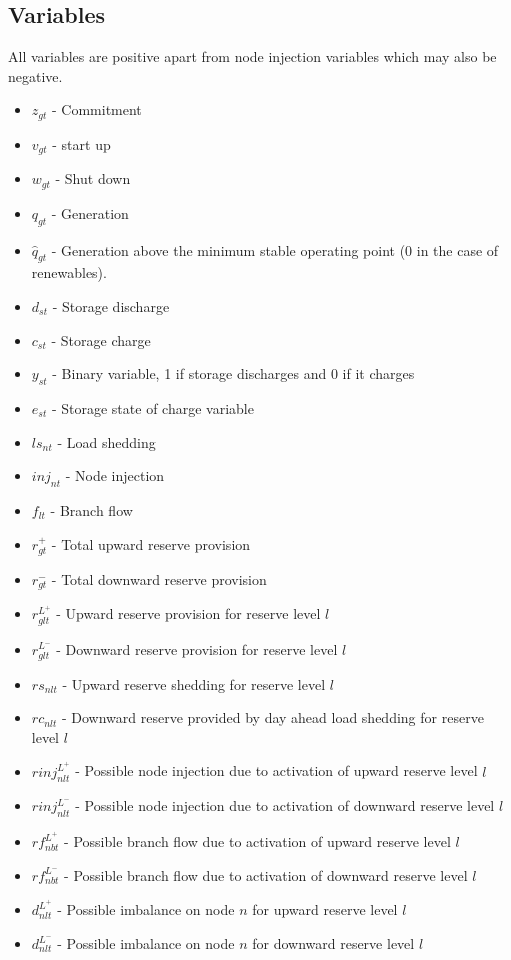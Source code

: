 \documentclass[number,times]{elsarticle}
\begin{document}
\subsection{Variables}

All variables are positive apart from node injection variables which may also be negative.

\begin{itemize}
    \item $z_{gt}$ - Commitment
    \item $v_{gt}$ - start up
    \item $w_{gt}$ - Shut down
    \item $q_{gt}$ - Generation
    \item $\hat{q}_{gt}$ - Generation above the minimum stable operating point (0 in the case of renewables).
    \item $d_{st}$ - Storage discharge
    \item $c_{st}$ - Storage charge
    \item $y_{st}$ - Binary variable, 1 if storage discharges and 0 if it charges
    \item $e_{st}$ - Storage state of charge variable
    \item $ls_{nt}$ - Load shedding
    \item $inj_{nt}$ - Node injection
    \item $f_{lt}$ - Branch flow
    \item $r^+_{gt}$ - Total upward reserve provision
    \item $r^-_{gt}$ - Total downward reserve provision
    \item $r^{L^+}_{glt}$ - Upward reserve provision for reserve level $l$
    \item $r^{L^-}_{glt}$ - Downward reserve provision for reserve level $l$
    \item $rs_{nlt}$ - Upward reserve shedding for reserve level $l$
    \item $rc_{nlt}$ - Downward reserve provided by day ahead load shedding for reserve level $l$
    \item $rinj_{nlt}^{L^+}$ - Possible node injection due to activation of upward reserve level $l$
    \item $rinj_{nlt}^{L^-}$ - Possible node injection due to activation of downward reserve level $l$
    \item $rf_{nbt}^{L^+}$ - Possible branch flow due to activation of upward reserve level $l$
    \item $rf_{nbt}^{L^-}$ - Possible branch flow due to activation of downward reserve level $l$
    \item $d_{nlt}^{L^+}$ - Possible imbalance on node $n$ for upward reserve level $l$
    \item $d_{nlt}^{L^-}$ - Possible imbalance on node $n$ for downward reserve level $l$
\end{itemize}
\end{document}

